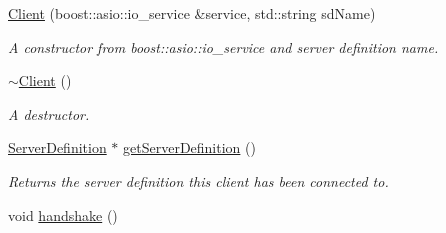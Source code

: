 \begin{DoxyCompactItemize}
\item 
\hyperlink{class_r_c_f_1_1_client_1_1_client_af33c081e68edc60672a985a47a49cbd9}{Client} (boost\+::asio\+::io\+\_\+service \&service, std\+::string sd\+Name)
\begin{DoxyCompactList}\small\item\em A constructor from boost\+::asio\+::io\+\_\+service and server definition name. \end{DoxyCompactList}\item 
\hypertarget{class_r_c_f_1_1_client_1_1_client_a73f3268d395a074869a25507fe19f38e}{}\hyperlink{class_r_c_f_1_1_client_1_1_client_a73f3268d395a074869a25507fe19f38e}{$\sim$\+Client} ()\label{class_r_c_f_1_1_client_1_1_client_a73f3268d395a074869a25507fe19f38e}

\begin{DoxyCompactList}\small\item\em A destructor. \end{DoxyCompactList}\item 
\hyperlink{class_r_c_f_1_1_client_1_1_server_definition}{Server\+Definition} $\ast$ \hyperlink{class_r_c_f_1_1_client_1_1_client_a1459e5b65c1ebdada7a46a8604464099}{get\+Server\+Definition} ()
\begin{DoxyCompactList}\small\item\em Returns the server definition this client has been connected to. \end{DoxyCompactList}\item 
\hypertarget{class_r_c_f_1_1_client_1_1_client_a0948bd7c88f562718ef70cd32360adf5}{}void \hyperlink{class_r_c_f_1_1_client_1_1_client_a0948bd7c88f562718ef70cd32360adf5}{handshake} ()\label{class_r_c_f_1_1_client_1_1_client_a0948bd7c88f562718ef70cd32360adf5}


\end{DoxyCompactItemize}
